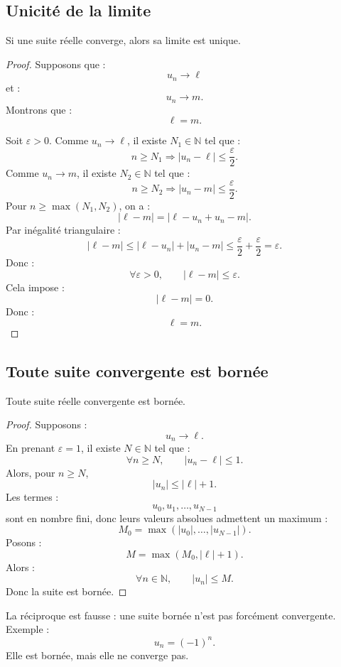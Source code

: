 \documentclass[11pt,a4paper]{article}
\newcommand{\N}{\mathbb N}
\newcommand{\abs}[1]{\left|#1\right|}
\newcommand{\implique}{\Longrightarrow}
\begin{document}
\subsection{Unicité de la limite}

\begin{theorembox}
Si une suite réelle converge, alors sa limite est unique.
\end{theorembox}

\begin{proof}
Supposons que :
\[
u_n\to \ell
\]
et :
\[
u_n\to m.
\]
Montrons que :
\[
\ell=m.
\]

Soit \(\varepsilon>0\).  
Comme \(u_n\to\ell\), il existe \(N_1\in\N\) tel que :
\[
n\geq N_1\implique \abs{u_n-\ell}\leq \frac{\varepsilon}{2}.
\]
Comme \(u_n\to m\), il existe \(N_2\in\N\) tel que :
\[
n\geq N_2\implique \abs{u_n-m}\leq \frac{\varepsilon}{2}.
\]
Pour \(n\geq \max(N_1,N_2)\), on a :
\[
\abs{\ell-m}
=
\abs{\ell-u_n+u_n-m}.
\]
Par inégalité triangulaire :
\[
\abs{\ell-m}
\leq
\abs{\ell-u_n}+\abs{u_n-m}
\leq
\frac{\varepsilon}{2}+\frac{\varepsilon}{2}
=
\varepsilon.
\]
Donc :
\[
\forall \varepsilon>0,\qquad \abs{\ell-m}\leq\varepsilon.
\]
Cela impose :
\[
\abs{\ell-m}=0.
\]
Donc :
\[
\ell=m.
\]
\end{proof}

\subsection{Toute suite convergente est bornée}

\begin{theorembox}
Toute suite réelle convergente est bornée.
\end{theorembox}

\begin{proof}
Supposons :
\[
u_n\to\ell.
\]
En prenant \(\varepsilon=1\), il existe \(N\in\N\) tel que :
\[
\forall n\geq N,\qquad \abs{u_n-\ell}\leq1.
\]
Alors, pour \(n\geq N\),
\[
\abs{u_n}\leq\abs{\ell}+1.
\]
Les termes :
\[
u_0,u_1,\dots,u_{N-1}
\]
sont en nombre fini, donc leurs valeurs absolues admettent un maximum :
\[
M_0=\max(\abs{u_0},\dots,\abs{u_{N-1}}).
\]
Posons :
\[
M=\max(M_0,\abs{\ell}+1).
\]
Alors :
\[
\forall n\in\N,\qquad \abs{u_n}\leq M.
\]
Donc la suite est bornée.
\end{proof}

\begin{erreurbox}
La réciproque est fausse : une suite bornée n'est pas forcément convergente.  
Exemple :
\[
u_n=(-1)^n.
\]
Elle est bornée, mais elle ne converge pas.
\end{erreurbox}
\end{document}
